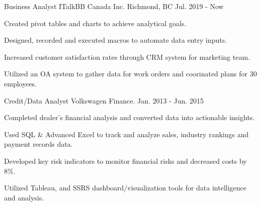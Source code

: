 \documentclass[11pt, a4paper]{awesome-cv}
\begin{document}
\begin{cventries}

  \cventry
    {Business Analyst} %
    {ITalkBB Canada Inc.} %
    {Richmond, BC} %
    {Jul. 2019 - Now} %
    {
      \begin{cvitems} %
        \item {Created pivot tables and charts to achieve analytical goals.}
        \item {Designed, recorded and executed macros to automate data entry inputs.}
        \item {Increased customer satisfaction rates through CRM system for marketing team.}
        \item {Utilized an OA system to gather data for work orders and coorinated plans for 30 employees.}
      \end{cvitems}
    }

  \cventry
  {Credit/Data Analyst} %
  {Volkswagen Finance.} %
  {} %
  {Jan. 2013 - Jun. 2015} %
  {
    \begin{cvitems} %
      \item {Completed dealer's financial analysis and converted data into actionable insights.}
      \item {Used SQL \& Advanced Excel to track and analyze sales, industry rankings and payment records data.}
      \item {Developed key risk indicators to monitor financial risks and decreased costs by 8\%.}
      \item {Utilized Tableau, and SSRS dashboard/visualization tools for data intelligence and analysis.}
    \end{cvitems}
  }
\end{cventries}



\end{document}
